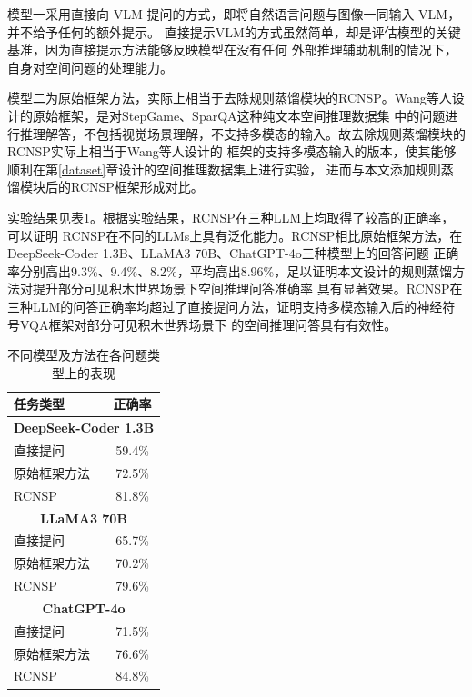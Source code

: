 模型一采用直接向 VLM 提问的方式，即将自然语言问题与图像一同输入 VLM，并不给予任何的额外提示。
直接提示VLM的方式虽然简单，却是评估模型的关键基准，因为直接提示方法能够反映模型在没有任何
外部推理辅助机制的情况下，自身对空间问题的处理能力。

模型二为原始框架方法，实际上相当于去除规则蒸馏模块的RCNSP。Wang等人设计的原始框架，是对StepGame、SparQA这种纯文本空间推理数据集
中的问题进行推理解答，不包括视觉场景理解，不支持多模态的输入。故去除规则蒸馏模块的RCNSP实际上相当于Wang等人设计的
框架的支持多模态输入的版本，使其能够顺利在第\ref{dataset}章设计的空间推理数据集上进行实验，
进而与本文添加规则蒸馏模块后的RCNSP框架形成对比。

实验结果见表\ref{tab:overall_comparison}。根据实验结果，RCNSP在三种LLM上均取得了较高的正确率，可以证明
RCNSP在不同的LLMs上具有泛化能力。RCNSP相比原始框架方法，在DeepSeek-Coder 1.3B、LLaMA3 70B、ChatGPT-4o三种模型上的回答问题
正确率分别高出9.3\%、9.4\%、8.2\%，平均高出8.96\%，足以证明本文设计的规则蒸馏方法对提升部分可见积木世界场景下空间推理问答准确率
具有显著效果。RCNSP在三种LLM的问答正确率均超过了直接提问方法，证明支持多模态输入后的神经符号VQA框架对部分可见积木世界场景下
的空间推理问答具有有效性。
\begin{table}[h]
    \centering
    \begin{tabular}{lc}
        \toprule
        \textbf{任务类型} & \textbf{正确率} \\
        \midrule
        \multicolumn{2}{c}{\textbf{DeepSeek-Coder 1.3B}} \\
        直接提问 & 59.4\% \\
        原始框架方法 & 72.5\% \\
        RCNSP & 81.8\% \\
        \midrule
        \multicolumn{2}{c}{\textbf{LLaMA3 70B}} \\
        直接提问 & 65.7\% \\
        原始框架方法 & 70.2\% \\
        RCNSP & 79.6\% \\
        \midrule
        \multicolumn{2}{c}{\textbf{ChatGPT-4o}} \\
        直接提问 & 71.5\% \\
        原始框架方法 & 76.6\% \\
        RCNSP & 84.8\% \\
        \bottomrule
    \end{tabular}
    \caption{不同模型及方法在各问题类型上的表现}
    \label{tab:overall_comparison}
\end{table}
